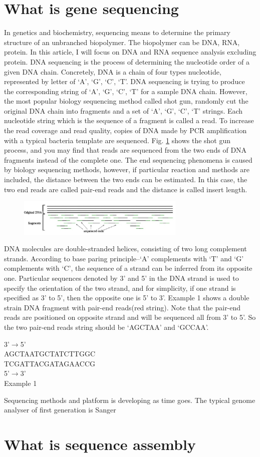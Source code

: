 \documentclass{article}
\begin{document}
\section{What is gene sequencing}
In genetics and biochemistry, sequencing means to determine the primary structure of an unbranched biopolymer. The biopolymer can be DNA, RNA, protein. In this article, I will focus on DNA and RNA sequence analysis excluding protein. DNA sequencing is the process of determining the nucleotide order of a given DNA chain. Concretely, DNA is a chain of four types nucleotide, represented by letter of `A', `G', `C', `T'. DNA sequencing is trying to produce the corresponding string of `A', `G', `C', `T' for a sample DNA chain. However, the most popular biology sequencing method called shot gun, randomly cut the original DNA chain into fragments and a set of `A', `G', `C', `T' strings. Each nucleotide string which is the sequence of a fragment is called a read. To increase the read coverage and read quality, copies of DNA made by PCR amplification with a typical bacteria template are sequenced. Fig. \ref{shot_gun_method} shows the shot gun process, and you may find that reads are sequenced from the two ends of DNA fragments instead of the complete one. The end sequencing phenomena is caused by biology sequencing methods, however, if particular reaction and methods are included, the distance between the two ends can be estimated. In this case, the two end reads are called pair-end reads and the distance is called insert length.\\
\begin{figure}[ht]
  \centering
  \includegraphics[width=8cm]{Figure1.jpg}\\
  \caption{}\label{shot_gun_method}
\end{figure}
DNA molecules are double-stranded helices, consisting of two long complement strands. According to base paring principle--`A' complements with `T' and `G' complements with `C', the sequence of a strand can be inferred from its opposite one. Particular sequences denoted by 3' and 5' in the DNA strand is used to specify the orientation of the two strand, and for simplicity, if one strand is specified as 3' to 5', then the opposite one is 5' to 3'. Example 1 shows a double strain DNA fragment with pair-end reads(red string). Note that the pair-end reads are positioned on opposite strand and will be sequenced all from 3' to 5'. So the two pair-end reads string should be `AGCTAA' and `GCCAA'.
\begin{center}
  3'$\rightarrow$5'\\
  {\color{red}AGCTAA}TGCTATCTTGGC\\
  TCGATTACGATAG{\color{red}AACCG}\\
  5'$\rightarrow$3'\\
  Example 1\\
\end{center}
Sequencing methods and platform is developing as time goes. The typical genome analyser of first generation is Sanger
\section{What is sequence assembly}

\renewcommand\refname{Reference}


\end{document}
